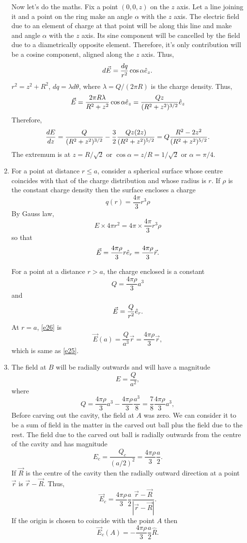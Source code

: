 \documentclass{article}
\begin{document}
\begin{enumerate}
Now let's do the maths. Fix a point $(0, 0, z)$ on the $z$ axis. Let a line joining
it and a point on the ring make an angle $\alpha$ with the $z$ axis. The electric
field due to an element of charge at that point will be along this line and make 
and angle $\alpha$ with the $z$ axis. Its sine component will be cancelled by the
field due to a diametrically opposite element. Therefore, it's only contribution
will be a cosine component, aligned along the $z$ axis. Thus,
\[
d\vec{E} = \frac{dq}{r^2}\cos\alpha\hat{e}_{z}.
\]
$r^2 = z^2 + R^2$, $dq = \lambda d\theta$, where $\lambda = Q/(2\pi R)$ is the
charge density. Thus,
\begin{equation}\label{e24}
\vec{E} = \frac{2\pi R\lambda}{R^2 + z^2}\cos\alpha\hat{e}_{z} = \frac{Qz}{(R^2 + z^2)^{3/2}}\hat{e}_{z}
\end{equation}
Therefore,
\[
\frac{d{E}}{d{z}} = \frac{Q}{(R^2 + z^2)^{3/2}} - \frac{3}{2}\frac{Qz(2z)}{(R^2 + z^2)^{5/2}}
= Q\frac{R^2 - 2z^2}{(R^2 + z^2)^{5/2}}.
\]
The extremum is at $z = R/\sqrt{2}$ or $\cos\alpha = z/R = 1/\sqrt{2}$ or $\alpha=
\pi/4$.

\item For a point at distance $r \le a$, consider a spherical surface whose centre
coincides with that of the charge distribution and whose radius is $r$. If $\rho$
is the constant charge density then the surface encloses a charge
\[
q(r) = \frac{4\pi}{3}r^3 \rho
\]
By Gauss law, 
\[
E \times 4\pi r^2 = 4\pi \times \frac{4\pi}{3}r^3 \rho
\]
so that
\begin{equation}\label{e25}
\vec{E} = \frac{4\pi\rho}{3}r\hat{e}_{r} = \frac{4\pi\rho}{3}\vec{r}.
\end{equation}

For a point at a distance $r > a$, the charge enclosed is a constant
\[
Q = \frac{4\pi\rho}{3}a^3
\]
and
\begin{equation}\label{e26}
\vec{E} = \frac{Q}{r^2}\hat{e}_{r}.
\end{equation}
At $r = a$, \eqref{e26} is
\[
\vec{E}(a) = \frac{Q}{a^3}\vec{r} = \frac{4\pi\rho}{3}\vec{r},
\]
which is same as \eqref{e25}.

\item The field at $B$ will be radially outwards and will have a magnitude
\[
E = \frac{Q}{a^2},
\]
where
\[
Q = \frac{4\pi\rho}{3}a^3 - \frac{4\pi\rho}{3}\frac{a^3}{8} = 
\frac{7}{8}\frac{4\pi\rho}{3}a^3,
\]
Before carving out the cavity, the field at $A$ was zero. We can consider it to
be a sum of field in the matter in the carved out ball plus the field due to the
rest. The field due to the carved out ball is radially outwards from the centre
of the cavity and has magnitude 
\[
E_c = \frac{Q_c}{(a/2)^2} = \frac{4\pi\rho}{3}\frac{a}{2}.
\]
If $\vec{R}$ is the centre of the cavity then the radially outward direction at
a point $\vec{r}$ is $\vec{r} - \vec{R}$. Thus,
\[
\vec{E}_c = \frac{4\pi\rho}{3}\frac{a}{2}\frac{\vec{r} - \vec{R}}{|\vec{r} - \vec{R}|}.
\]
If the origin is chosen to coincide with the point $A$ then
\[
\vec{E}_c(A) = -\frac{4\pi\rho}{3}\frac{a}{2}\hat{R}.
\]


\end{enumerate}
\end{document}
